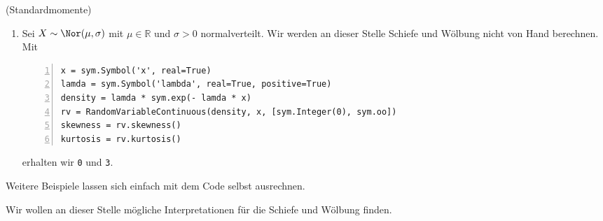 \begin{Beispiel}{(Standardmomente)}
\begin{enumerate}[label=(\roman*)]
\item Sei $X \sim \Nor(\mu, \sigma)$ mit $\mu \in \mathbb{R}$ und $\sigma > 0$ normalverteilt. Wir werden an dieser Stelle Schiefe und Wölbung nicht von Hand berechnen. Mit
\begin{lstlisting}[numbers=left, numberstyle=\tiny\color{codegray}]
x = sym.Symbol('x', real=True)
lamda = sym.Symbol('lambda', real=True, positive=True)
density = lamda * sym.exp(- lamda * x)
rv = RandomVariableContinuous(density, x, [sym.Integer(0), sym.oo])
skewness = rv.skewness()
kurtosis = rv.kurtosis()
\end{lstlisting}
erhalten wir \lstinline|0| und \lstinline|3|.
\end{enumerate}
Weitere Beispiele lassen sich einfach mit dem Code selbst ausrechnen.
\end{Beispiel}

Wir wollen an dieser Stelle mögliche Interpretationen für die Schiefe und Wölbung finden.

